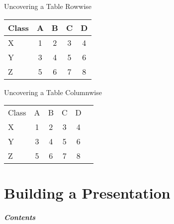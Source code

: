      \begin{frame}
     Uncovering a Table Rowwise \newline
     \begin{tabular}{l!{\vrule}cccc}
     Class & A & B & C & D \\\hline
     X     & 1 & 2 & 3 & 4 \pause\\
       Y     & 3 & 4 & 5 & 6 \pause\\
       Z     &5&6&7&8
       \end{tabular}
       \end{frame}

       \begin{frame}
       Uncovering a Table Columnwise \newline
       \begin{tabular}{l!{\vrule}c<{}c<{}c<{}c<{\onslide}c}
       Class & A & B & C & D \\
         X     & 1 & 2 & 3 & 4 \\
         Y     & 3 & 4 & 5 & 6 \\
         Z     &5&6&7&8
         \end{tabular}
         \end{frame}
         \part{Building a Presentation}
         \frame{\partpage}
         \begin{frame}
         \frametitle{Contents}
         \end{frame}
